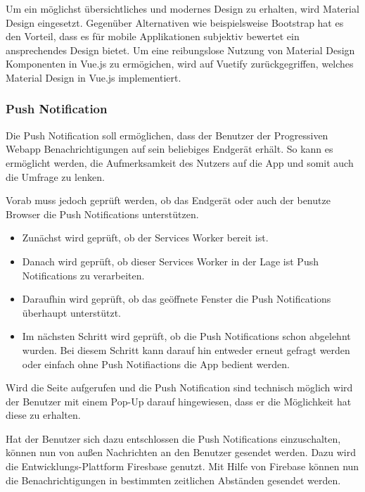 Um ein möglichst übersichtliches und modernes Design zu erhalten, wird Material Design eingesetzt. Gegenüber Alternativen wie beispielsweise Bootstrap hat es den Vorteil, dass es für mobile Applikationen subjektiv bewertet ein ansprechendes Design bietet. Um eine reibungslose Nutzung von Material Design Komponenten in Vue.js zu ermögichen, wird auf Vuetify zurückgegriffen, welches Material Design in Vue.js implementiert.

\subsubsection{Push Notification}
Die Push Notification soll ermöglichen, dass der Benutzer der Progressiven Webapp Benachrichtigungen auf sein beliebiges Endgerät erhält. So kann es ermöglicht werden, die Aufmerksamkeit des Nutzers auf die App und somit auch die Umfrage zu lenken. 

Vorab muss jedoch geprüft werden, ob das Endgerät oder auch der benutze Browser die Push Notifications unterstützen. 

\begin{itemize}
\item Zunächst wird geprüft, ob der Services Worker bereit ist. 
\item Danach wird geprüft, ob dieser Services Worker in der Lage ist Push Notifications zu verarbeiten.
\item Daraufhin wird geprüft, ob das geöffnete Fenster die Push Notifications überhaupt unterstützt.
\item Im nächsten Schritt wird geprüft, ob die Push Notifications schon abgelehnt wurden. Bei diesem Schritt kann darauf hin entweder erneut gefragt werden oder einfach ohne Push Notifiactions die App bedient werden.
\end{itemize} 

Wird die Seite aufgerufen und die Push Notification sind technisch möglich wird der Benutzer mit einem Pop-Up darauf hingewiesen, dass er die Möglichkeit hat diese zu erhalten. 

Hat der Benutzer sich dazu entschlossen die Push Notifications einzuschalten, können nun von außen Nachrichten an den Benutzer gesendet werden. Dazu wird die Entwicklungs-Plattform Firesbase genutzt. Mit Hilfe von Firebase können nun die Benachrichtigungen in bestimmten zeitlichen Abständen gesendet werden.

